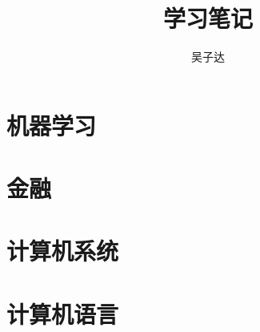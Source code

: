 \documentclass[a4paper,12pt]{book}
\begin{document}
\author{吴子达}
\title{学习笔记}

\frontmatter
\maketitle
\tableofcontents

\mainmatter
\part{机器学习}



\part{金融}



\part{计算机系统}

\part{计算机语言}



\backmatter
\end{document}
